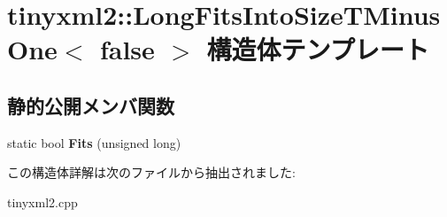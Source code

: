 \hypertarget{structtinyxml2_1_1_long_fits_into_size_t_minus_one_3_01false_01_4}{}\section{tinyxml2\+:\+:Long\+Fits\+Into\+Size\+T\+Minus\+One$<$ false $>$ 構造体テンプレート}
\label{structtinyxml2_1_1_long_fits_into_size_t_minus_one_3_01false_01_4}
\subsection*{静的公開メンバ関数}
\begin{DoxyCompactItemize}
\item 
\mbox{\label{structtinyxml2_1_1_long_fits_into_size_t_minus_one_3_01false_01_4_a29b01087f38a951276df69d358dc0764}} 
static bool {\bfseries Fits} (unsigned long)
\end{DoxyCompactItemize}


この構造体詳解は次のファイルから抽出されました\+:\begin{DoxyCompactItemize}
\item 
tinyxml2.\+cpp\end{DoxyCompactItemize}
